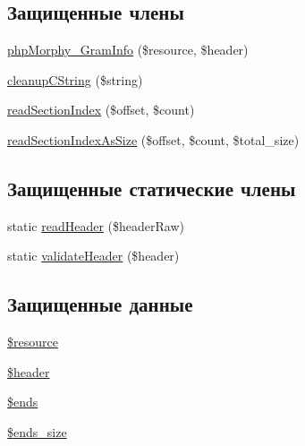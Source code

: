 \subsection*{Защищенные члены}
\begin{DoxyCompactItemize}
\item 
\hyperlink{classphpMorphy__GramInfo_aabb555db34186e402306f16f7d7e4998}{phpMorphy\_\-GramInfo} (\$resource, \$header)
\item 
\hyperlink{classphpMorphy__GramInfo_adfe66d28e700d0c62ecaeead824e0609}{cleanupCString} (\$string)
\item 
\hyperlink{classphpMorphy__GramInfo_ac0bcd84965c3a79c63c68b68012aafae}{readSectionIndex} (\$offset, \$count)
\item 
\hyperlink{classphpMorphy__GramInfo_af97aa7d07f63fe0108188312b62a3fee}{readSectionIndexAsSize} (\$offset, \$count, \$total\_\-size)
\end{DoxyCompactItemize}
\subsection*{Защищенные статические члены}
\begin{DoxyCompactItemize}
\item 
static \hyperlink{classphpMorphy__GramInfo_a158878a24703dedacf4b33f26a94ff48}{readHeader} (\$headerRaw)
\item 
static \hyperlink{classphpMorphy__GramInfo_a87be8c53342cae3093966c9ee40c82d9}{validateHeader} (\$header)
\end{DoxyCompactItemize}
\subsection*{Защищенные данные}
\begin{DoxyCompactItemize}
\item 
\hyperlink{classphpMorphy__GramInfo_a2f3811aa2781d9827c551dae758228ad}{\$resource}
\item 
\hyperlink{classphpMorphy__GramInfo_a9f1d11474de5ba74ca4743d393963fb3}{\$header}
\item 
\hyperlink{classphpMorphy__GramInfo_a2e3950504fd6aa88215df2e8ea7ea2ad}{\$ends}
\item 
\hyperlink{classphpMorphy__GramInfo_ac0080077fdcb57d32de060d300f2a438}{\$ends\_\-size}
\end{DoxyCompactItemize}


